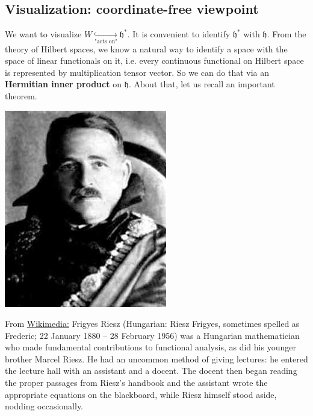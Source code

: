 \documentclass[../main.tex]{subfiles}
\begin{document}
\subsection{Visualization: coordinate-free viewpoint}
We want to visualize $W\underset{\textrm{"acts on"}}{\hookrightarrow}\mathfrak{h}^\ast$. It is convenient to identify $\mathfrak{h}^\ast$ with $\mathfrak{h}$.%
From the theory of Hilbert spaces, we know a natural way to identify a space with the space of linear functionals on it, i.e. every continuous functional on Hilbert space is represented by multiplication tensor vector. So we can do that via an \textbf{Hermitian inner product} on $\mathfrak{h}$. About that, let us recall an important theorem.
\begin{marginfigure}
	\includegraphics[width=1\linewidth]{images/Frigyes_Riesz.jpeg}
	\caption[Photo of Frigyes Riesz]{From \href{https://commons.wikimedia.org/wiki/File:Frigyes_Riesz.jpeg}{Wikimedia:} Frigyes Riesz (Hungarian: Riesz Frigyes, sometimes spelled as Frederic; 22 January 1880 – 28 February 1956) was a Hungarian mathematician who made fundamental contributions to functional analysis, as did his younger brother Marcel Riesz. He had an uncommon method of giving lectures: he entered the lecture hall with an assistant and a docent. The docent then began reading the proper passages from Riesz's handbook and the assistant wrote the appropriate equations on the blackboard, while Riesz himself stood aside, nodding occasionally.}
\end{marginfigure}
\end{document}
